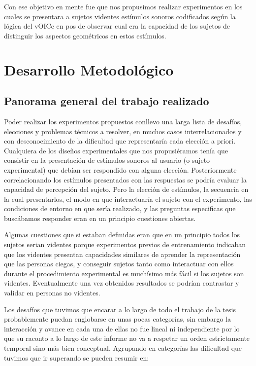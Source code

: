 \documentclass{article}
\begin{document}
    Con ese objetivo en mente fue que nos propusimos realizar experimentos en los cuales se presentara a sujetos videntes estímulos sonoros codificados según la lógica del vOICe en pos de observar cual era la capacidad de los sujetos de distinguir los aspectos geométricos en estos estímulos. 


\section{Desarrollo Metodológico}

\subsection{Panorama general del trabajo realizado}

    Poder realizar los experimentos propuestos conllevo una larga lista de desafíos, elecciones y problemas técnicos a resolver, en muchos casos interrelacionados y con desconocimiento de la dificultad que representaría cada elección a priori. Cualquiera de los diseños experimentales que nos propusiéramos tenía que consistir en la presentación de estímulos sonoros al usuario (o sujeto experimental) que debían ser respondido con alguna elección. Posteriormente correlacionando los estímulos presentados con las respuestas se podría evaluar la capacidad de percepción del sujeto. Pero la elección de estímulos, la secuencia en la cual presentarlos, el modo en que interactuaría el sujeto con el experimento, las condiciones de entorno en que sería realizado, y las preguntas especificas que buscábamos responder eran en un principio cuestiones abiertas.
    
    Algunas cuestiones que si estaban definidas eran que en un principio todos los sujetos serian videntes porque experimentos previos de entrenamiento \cite{VoiceEntrenamiento3} indicaban que los videntes presentan capacidades similares de aprender la representación que las personas ciegas, y conseguir sujetos tanto como interactuar con ellos durante el procedimiento experimental es muchísimo más fácil si los sujetos son videntes. Eventualmente una vez obtenidos resultados se podrían contrastar y validar en personas no videntes. 
        
    Los desafíos que tuvimos que encarar a lo largo de todo el trabajo de la tesis probablemente puedan englobarse en unas pocas categorías, sin embargo la interacción y avance en cada una de ellas no fue lineal ni independiente por lo que su raconto a lo largo de este informe no va a respetar un orden estrictamente temporal sino más bien conceptual. Agrupando en categorías las dificultad que tuvimos que ir superando se pueden resumir en:
    
\end{document}
